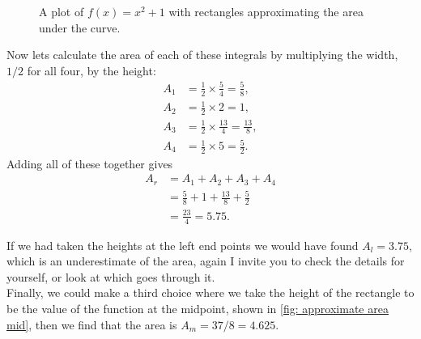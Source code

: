 \begin{figure}[ht]
    \centering
{}
    \caption{A plot of  $f(x)=x^{2}+1$ with rectangles approximating the area under the curve.}
        \label{fig: approximate area}
\end{figure}

Now lets calculate the area of each of these integrals by multiplying the width, $1/2$ for all four, by the height:
\begin{align*}
A_{1}&=\frac{1}{2}\times\frac{5}{4}=\frac{5}{8} ,\\
A_{2}&=\frac{1}{2}\times 2=1,\\
A_{3}&=\frac{1}{2}\times\frac{13}{4}=\frac{13}{8},\\
A_{4}&=\frac{1}{2}\times 5=\frac{5}{2}.
\end{align*}
Adding all of these together gives
\begin{align*}
A_{r} 	&=A_{1}+A_{2}+A_{3}+A_{4}\\
	&=\frac{5}{8}+1+\frac{13}{8}+\frac{5}{2}\\
	&=\frac{23}{4}=5.75.
\end{align*}

If we had taken the heights at the left end points we would have found $A_{l}=3.75$, which is an underestimate of the area, again I invite you to check the details for yourself, or look at \cite{calcI} which goes through it.\\

Finally, we could make a third choice where we take the height of the rectangle to be the value of the function at the midpoint, shown in \cref{fig: approximate area mid}, then we find that the area is $A_{m}=37/8=4.625$.\\

